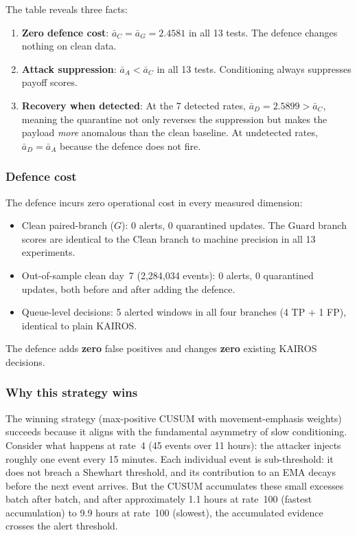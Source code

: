 \documentclass[10pt,twocolumn]{article}
\begin{document}
The table reveals three facts:
\begin{enumerate}
  \item \textbf{Zero defence cost}: $\bar{a}_C = \bar{a}_G = 2.4581$ in
    all 13 tests.  The defence changes nothing on clean data.
  \item \textbf{Attack suppression}: $\bar{a}_A < \bar{a}_C$ in all 13 tests.
    Conditioning always suppresses payoff scores.
  \item \textbf{Recovery when detected}: At the 7 detected rates,
    $\bar{a}_D = 2.5899 > \bar{a}_C$, meaning the quarantine not only
    reverses the suppression but makes the payload \emph{more} anomalous
    than the clean baseline.  At undetected rates, $\bar{a}_D = \bar{a}_A$
    because the defence does not fire.
\end{enumerate}

\subsubsection{Defence cost}

The defence incurs zero operational cost in every measured dimension:
\begin{itemize}
  \item Clean paired-branch ($G$): 0 alerts, 0 quarantined updates.
    The Guard branch scores are identical to the Clean branch to machine
    precision in all 13 experiments.
  \item Out-of-sample clean day~7 (2,284,034 events): 0 alerts,
    0 quarantined updates, both before and after adding the defence.
  \item Queue-level decisions: 5 alerted windows in all four branches
    (4 TP + 1 FP), identical to plain KAIROS.
\end{itemize}
The defence adds \textbf{zero} false positives and changes \textbf{zero}
existing KAIROS decisions.

\subsubsection{Why this strategy wins}

The winning strategy (max-positive CUSUM with movement-emphasis weights)
succeeds because it aligns with the fundamental asymmetry of slow
conditioning.  Consider what happens at rate~4 (45 events over 11 hours):
the attacker injects roughly one event every 15 minutes.  Each individual
event is sub-threshold: it does not breach a Shewhart threshold, and its
contribution to an EMA decays before the next event arrives.  But the
CUSUM accumulates these small excesses batch after batch, and after
approximately 1.1 hours at rate~100 (fastest accumulation) to
9.9 hours at rate~100 (slowest), the accumulated evidence crosses the alert
threshold.
\end{document}
